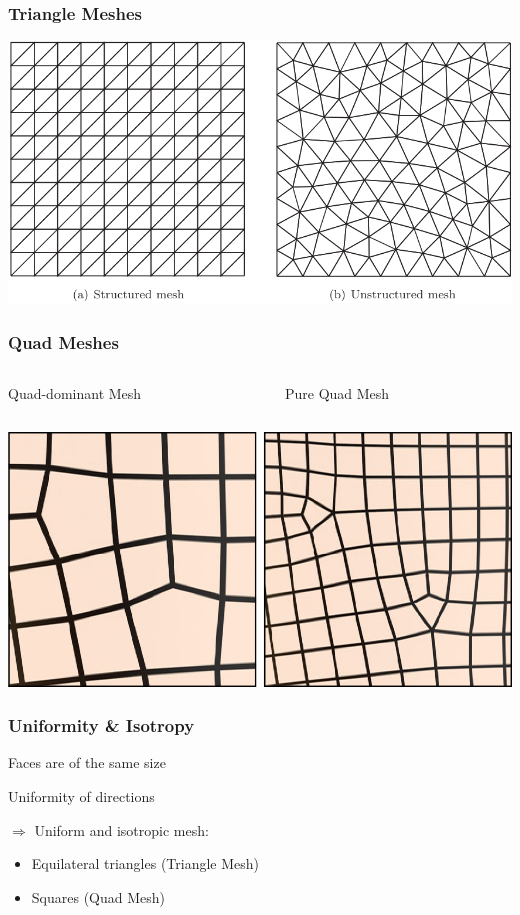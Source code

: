 \documentclass[aspectratio=43,sanserif,professionalfonts]{beamer}
\begin{document}
\begin{frame}
\frametitle{Triangle Meshes}
	\center
	\includegraphics[width=\textwidth]{img/triangles.png}
\end{frame}

\begin{frame}
	\frametitle{Quad Meshes}
	\begin{columns}
		\begin{column}{0.5\textwidth}
			\centering
			Quad-dominant Mesh
		\end{column}
		\begin{column}{0.5\textwidth}
			\centering
			Pure Quad Mesh
		\end{column}
	\end{columns}
	\includegraphics[width=\textwidth]{img/Quad.png}
\end{frame}

\begin{frame}
	\frametitle{Uniformity \& Isotropy}
	\begin{tcolorbox}[colback=green!5,colframe=green!40!black,title=Uniformity]
		Faces are of the same size
	\end{tcolorbox}
	\pause
	\begin{tcolorbox}[colback=green!5,colframe=green!40!black,title=Isotropy]
		Uniformity of directions
	\end{tcolorbox}
	\pause
	$\Rightarrow$ Uniform and isotropic mesh:
	\begin{itemize}
		\item Equilateral triangles (Triangle Mesh)
		\item Squares (Quad Mesh)
	\end{itemize}
\end{frame}
\end{document}
